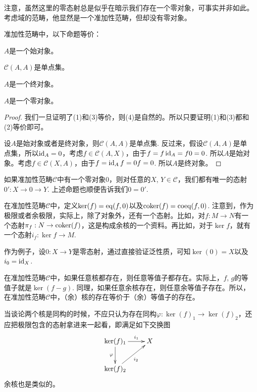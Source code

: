 注意，虽然这里的零态射总是似乎在暗示我们存在一个零对象，可事实并非如此。考虑域的范畴，他显然是一个准加性范畴，但却没有零对象。

\begin{pro}\label{zeroobj}
准加性范畴中，以下命题等价：
\begin{compactenum}[~~~(1)]
\item $A$是一个始对象。
\item $\mathcal{C}(A,A)$是单点集。
\item $A$是一个终对象。
\item $A$是一个零对象。
\end{compactenum}
\end{pro}

\begin{proof}
我们一旦证明了(1)和(3)等价，则(4)是自然的。所以只要证明(1)和(3)都和(2)等价即可。

设$A$是始对象或者是终对象，则$\mathcal{C}(A,A)$是单点集. 反过来，假设$\mathcal{C}(A,A)$是单点集，所以$\operatorname{id}_A=0$，考虑$f\in \mathcal{C}(A,X)$，由于$f=f\operatorname{id}_A=f0=0$. 所以$A$是始对象。考虑$f\in \mathcal{C}(X,A)$，由于$f=\operatorname{id}_A f=0f=0$. 所以$A$是终对象。
\end{proof}

如果准加性范畴$\mathcal{C}$中有一个零对象$0$，则对任意的$X$, $Y\in\mathcal{C}$，我们都有唯一的态射$0': X\to 0 \to Y$. 上述命题也顺便告诉我们$0=0'$. 

\begin{para}
在准加性范畴$\mathcal{C}$中，定义$\ker(f)=\operatorname{eq}(f,0)$以及$\operatorname{coker}(f)=\mathrm{coeq}(f,0)$. 注意到，作为极限或者余极限，实际上，除了对象外，还有一个态射。比如，对$f:M\to N$有一个态射$\pi_f:N\to \operatorname{coker}(f)$，这是构成余核的一个资料。再比如，对于$\ker f$，就有一个态射$i_f:\ker f\to M$. 
\end{para}

作为例子，设$0:X\to Y$是零态射，通过直接验证泛性质，可知$\ker(0)=X$以及$i_0=\operatorname{id}_X$.

\begin{para}
在准加性范畴$\mathcal{C}$中，如果任意核都存在，则任意等值子都存在。实际上，$f$, $g$的等值子就是$\ker(f-g)$. 同理，如果任意余核存在，则任意余等值子存在。所以，在准加性范畴$\mathcal{C}$中，（余）核的存在等价于（余）等值子的存在。
\end{para}

当谈论两个核是同构的时候，不应只认为存在同构$\varphi:\ker(f)_1\to \ker(f)_2$，还应把极限包含的态射拿进来一起看，即满足如下交换图
\[
\begin{xy}
	\xymatrix{
	\ker(f)_1\ar[d]_{\varphi}\ar[r]^-{i_1} &X\\
	\ker(f)_2\ar[ru]_{i_2}
	}
\end{xy}
\]
余核也是类似的。

